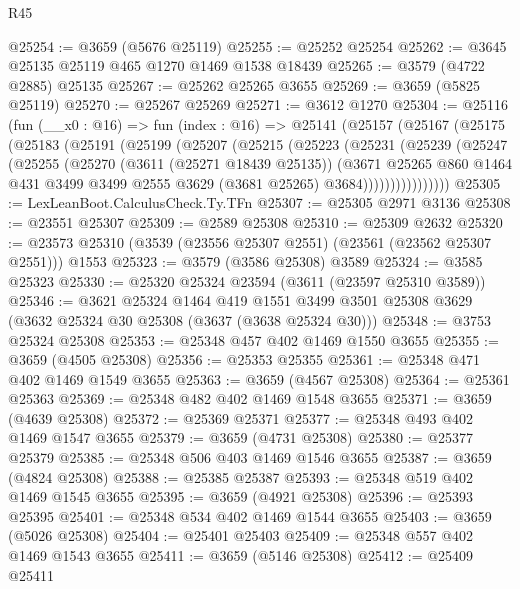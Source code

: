 \begin{lexlean}{R45}
\begin{coremodule}
@25254 := @3659 (@5676 @25119)
@25255 := @25252 @25254
@25262 := @3645 @25135 @25119 @465 @1270 @1469 @1538 @18439
@25265 := @3579 (@4722 @2885) @25135
@25267 := @25262 @25265 @3655
@25269 := @3659 (@5825 @25119)
@25270 := @25267 @25269
@25271 := @3612 @1270
@25304 := @25116
    (fun (__x0 : @16) =>
    fun (index : @16) =>
    @25141
      (@25157
        (@25167
          (@25175
            (@25183
              (@25191
                (@25199
                  (@25207
                    (@25215
                      (@25223
                        (@25231
                          (@25239
                            (@25247
                              (@25255
                                (@25270
                                  (@3611 (@25271 @18439 @25135))
                                  (@3671
                                    @25265
                                    @860
                                    @1464
                                    @431
                                    @3499
                                    @3499
                                    @2555
                                    @3629
                                    (@3681 @25265)
                                    @3684))))))))))))))))
@25305 := LexLeanBoot.CalculusCheck.Ty.TFn
@25307 := @25305 @2971 @3136
@25308 := @23551 @25307
@25309 := @2589 @25308
@25310 := @25309 @2632
@25320 := @23573 @25310 (@3539 (@23556 @25307 @2551) (@23561 (@23562 @25307 @2551))) @1553
@25323 := @3579 (@3586 @25308) @3589
@25324 := @3585 @25323
@25330 := @25320 @25324 @23594 (@3611 (@23597 @25310 @3589))
@25346 := @3621
    @25324
    @1464
    @419
    @1551
    @3499
    @3501
    @25308
    @3629
    (@3632 @25324 @30 @25308 (@3637 (@3638 @25324 @30)))
@25348 := @3753 @25324 @25308
@25353 := @25348 @457 @402 @1469 @1550 @3655
@25355 := @3659 (@4505 @25308)
@25356 := @25353 @25355
@25361 := @25348 @471 @402 @1469 @1549 @3655
@25363 := @3659 (@4567 @25308)
@25364 := @25361 @25363
@25369 := @25348 @482 @402 @1469 @1548 @3655
@25371 := @3659 (@4639 @25308)
@25372 := @25369 @25371
@25377 := @25348 @493 @402 @1469 @1547 @3655
@25379 := @3659 (@4731 @25308)
@25380 := @25377 @25379
@25385 := @25348 @506 @403 @1469 @1546 @3655
@25387 := @3659 (@4824 @25308)
@25388 := @25385 @25387
@25393 := @25348 @519 @402 @1469 @1545 @3655
@25395 := @3659 (@4921 @25308)
@25396 := @25393 @25395
@25401 := @25348 @534 @402 @1469 @1544 @3655
@25403 := @3659 (@5026 @25308)
@25404 := @25401 @25403
@25409 := @25348 @557 @402 @1469 @1543 @3655
@25411 := @3659 (@5146 @25308)
@25412 := @25409 @25411

\end{coremodule}
\end{lexlean}
